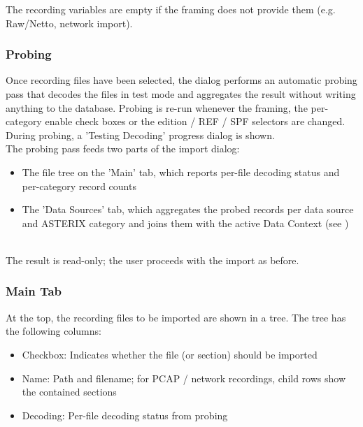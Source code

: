 The recording variables are empty if the framing does not provide them (e.g. Raw/Netto, network import).

\subsubsection{Probing}
\label{sec:ui_import_asterix_probing}

Once recording files have been selected, the dialog performs an automatic probing pass that decodes the files in test mode and aggregates the result without writing anything to the database. Probing is re-run whenever the framing, the per-category enable check boxes or the edition / REF / SPF selectors are changed. During probing, a 'Testing Decoding' progress dialog is shown. \\

The probing pass feeds two parts of the import dialog:

\begin{itemize}
\item The file tree on the 'Main' tab, which reports per-file decoding status and per-category record counts
\item The 'Data Sources' tab, which aggregates the probed records per data source and ASTERIX category and joins them with the active Data Context (see )
\end{itemize}
\ \\

The result is read-only; the user proceeds with the import as before. \\

\subsubsection{Main Tab}

At the top, the recording files to be imported are shown in a tree. The tree has the following columns:

\begin{itemize}
\item Checkbox: Indicates whether the file (or section) should be imported
\item Name: Path and filename; for PCAP / network recordings, child rows show the contained sections
\item Decoding: Per-file decoding status from probing
\end{itemize}
\ \\

